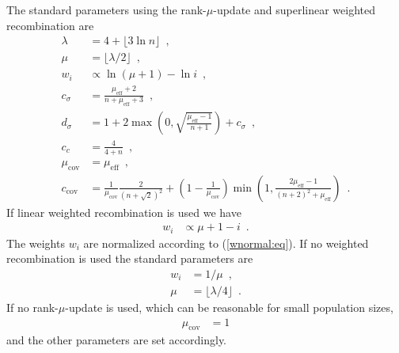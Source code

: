 The standard parameters using the rank-$\mu$-update and superlinear weighted recombination
are
\begin{align}
\lambda &= 4 + \lfloor 3 \ln n\rfloor\enspace,\label{mu1:eq}\\
\mu &= \lfloor \lambda / 2 \rfloor\enspace,\\
w_i &\propto \ln(\mu + 1)- \ln i\enspace,\\
c_\sigma &= \frac{\mu_{\text{eff}}+2}{n + \mu_{\text{eff}} +  3}\enspace,\\
d_\sigma &= 1 +  2\max\left(0, \sqrt{\frac{\mu_{\text{eff}}-1}{n+1}}\right) +
  c_\sigma\enspace,\\
c_c&=\frac{4}{4+n}\enspace,\\
\mu_{\text{cov}}&=\mu_{\text{eff}}\enspace,\\
c_{\text{cov}}&= \frac{1}{\mu_{\text{cov}}}  \frac{2}{(n+\sqrt{2})^2}+\left(1-\frac{1}{\mu_{\text{cov}}}\right)\min\left(1,
\frac{2\mu_{\text{eff}} -1  }{(n+2)^2+\mu_{\text{eff}}}\right)\enspace.
\end{align}
If linear weighted recombination is used we
have 
\begin{align}
w_i &\propto \mu +  1 -  i\enspace.
\end{align}
The weights $w_i$ are normalized according to (\ref{wnormal:eq}). 
If no weighted recombination is used the standard parameters are
\begin{align}   
w_i &= 1/\mu \enspace,\\
\mu &= \lfloor \lambda / 4 \rfloor\enspace.
\end{align}                        
If no rank-$\mu$-update is used, which can be reasonable for small population sizes,
\begin{align}   
\mu_{\text{cov}}&=1
\end{align}                                                               
and the other parameters are set accordingly.

